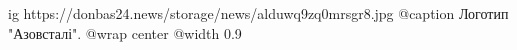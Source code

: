  
 
 
 
 

\ifcmt
  ig https://donbas24.news/storage/news/alduwq9zq0mrsgr8.jpg
	@caption Логотип "Азовсталі".
  @wrap center
  @width 0.9
\fi
